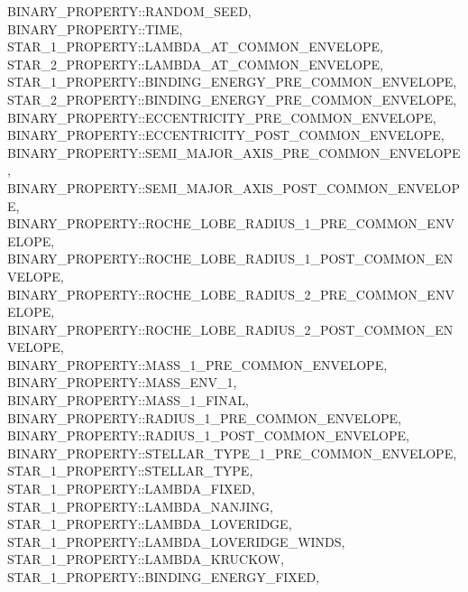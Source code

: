 \hfill
\begin{minipage}{\dimexpr\textwidth-2em}
    BINARY\_PROPERTY::RANDOM\_SEED, \\
    BINARY\_PROPERTY::TIME, \\
    STAR\_1\_PROPERTY::LAMBDA\_AT\_COMMON\_ENVELOPE, \\
    STAR\_2\_PROPERTY::LAMBDA\_AT\_COMMON\_ENVELOPE, \\
    STAR\_1\_PROPERTY::BINDING\_ENERGY\_PRE\_COMMON\_ENVELOPE, \\
    STAR\_2\_PROPERTY::BINDING\_ENERGY\_PRE\_COMMON\_ENVELOPE, \\
    BINARY\_PROPERTY::ECCENTRICITY\_PRE\_COMMON\_ENVELOPE, \\
    BINARY\_PROPERTY::ECCENTRICITY\_POST\_COMMON\_ENVELOPE, \\
    BINARY\_PROPERTY::SEMI\_MAJOR\_AXIS\_PRE\_COMMON\_ENVELOPE, \\
    BINARY\_PROPERTY::SEMI\_MAJOR\_AXIS\_POST\_COMMON\_ENVELOPE, \\
    BINARY\_PROPERTY::ROCHE\_LOBE\_RADIUS\_1\_PRE\_COMMON\_ENVELOPE, \\
    BINARY\_PROPERTY::ROCHE\_LOBE\_RADIUS\_1\_POST\_COMMON\_ENVELOPE, \\
    BINARY\_PROPERTY::ROCHE\_LOBE\_RADIUS\_2\_PRE\_COMMON\_ENVELOPE, \\
    BINARY\_PROPERTY::ROCHE\_LOBE\_RADIUS\_2\_POST\_COMMON\_ENVELOPE, \\
    BINARY\_PROPERTY::MASS\_1\_PRE\_COMMON\_ENVELOPE, \\
    BINARY\_PROPERTY::MASS\_ENV\_1, \\
    BINARY\_PROPERTY::MASS\_1\_FINAL, \\
    BINARY\_PROPERTY::RADIUS\_1\_PRE\_COMMON\_ENVELOPE, \\
    BINARY\_PROPERTY::RADIUS\_1\_POST\_COMMON\_ENVELOPE, \\
    BINARY\_PROPERTY::STELLAR\_TYPE\_1\_PRE\_COMMON\_ENVELOPE, \\
    STAR\_1\_PROPERTY::STELLAR\_TYPE, \\
    STAR\_1\_PROPERTY::LAMBDA\_FIXED, \\
    STAR\_1\_PROPERTY::LAMBDA\_NANJING, \\
    STAR\_1\_PROPERTY::LAMBDA\_LOVERIDGE, \\
    STAR\_1\_PROPERTY::LAMBDA\_LOVERIDGE\_WINDS, \\
    STAR\_1\_PROPERTY::LAMBDA\_KRUCKOW, \\
    STAR\_1\_PROPERTY::BINDING\_ENERGY\_FIXED, \\

\end{minipage}
